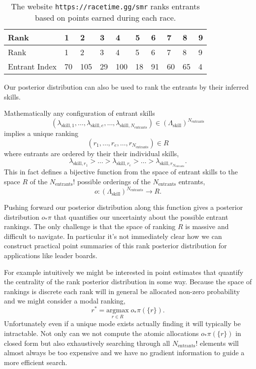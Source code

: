 \documentclass[
  letterpaper,
  DIV=11,
  numbers=noendperiod]{scrartcl}
\begin{document}
\begin{longtable}[]{@{}llllllllll@{}}
\caption{The website \texttt{https://racetime.gg/smr} ranks entrants
based on points earned during each
race.}\label{tbl-leader-board}\tabularnewline
\toprule\noalign{}
Rank & 1 & 2 & 3 & 4 & 5 & 6 & 7 & 8 & 9 \\
\midrule\noalign{}
\endfirsthead
\toprule\noalign{}
Rank & 1 & 2 & 3 & 4 & 5 & 6 & 7 & 8 & 9 \\
\midrule\noalign{}
\endhead
\bottomrule\noalign{}
\endlastfoot
Entrant Index & 70 & 105 & 29 & 100 & 18 & 91 & 60 & 65 & 4 \\
\end{longtable}

Our posterior distribution can also be used to rank the entrants by
their inferred skills.

Mathematically any configuration of entrant skills \[
( \lambda_{\mathrm{skill}, 1}, \ldots,
  \lambda_{\mathrm{skill}, e}, \ldots,
  \lambda_{\mathrm{skill}, N_{\mathrm{entrants}}} )
\in \left( \Lambda_{\mathrm{skill}} \right)^{N_{\mathrm{entrants}}}
\] implies a unique ranking \[
(r_{1}, \ldots, r_{e}, \ldots, r_{N_{\mathrm{entrants}}}) \in R
\] where entrants are ordered by their their individual skills, \[
\lambda_{\mathrm{skill}, r_{1}} > \ldots >
\lambda_{\mathrm{skill}, r_{e}} > \ldots >
\lambda_{\mathrm{skill}, r_{N_{\mathrm{entrants}}}}.
\] This in fact defines a bijective function from the space of entrant
skills to the space \(R\) of the \(N_{\mathrm{entrants}}!\) possible
orderings of the \(N_{\mathrm{entrants}}\) entrants, \[
o : \left( \Lambda_{\mathrm{skill}} \right)^{N_{\mathrm{entrants}}}
    \rightarrow R.
\]

Pushing forward our posterior distribution along this function gives a
posterior distribution \(o_{*} \pi\) that quantifies our uncertainty
about the possible entrant rankings. The only challenge is that the
space of ranking \(R\) is massive and difficult to navigate. In
particular it's not immediately clear how we can construct practical
point summaries of this rank posterior distribution for applications
like leader boards.

For example intuitively we might be interested in point estimates that
quantify the centrality of the rank posterior distribution in some way.
Because the space of rankings is discrete each rank will in general be
allocated non-zero probability and we might consider a modal ranking, \[
r^{*} = \underset{r \in R}{\mathrm{argmax}} \; o_{*} \pi( \{ r \} ).
\] Unfortunately even if a unique mode exists actually finding it will
typically be intractable. Not only can we not compute the atomic
allocations \(o_{*} \pi( \{ r \} )\) in closed form but also
exhaustively searching through all \(N_{\mathrm{entrants}}!\) elements
will almost always be too expensive and we have no gradient information
to guide a more efficient search.
\end{document}

